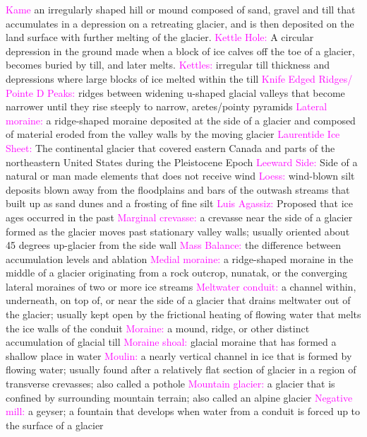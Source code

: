 \documentclass{article}
\newcommand{\pink}[1]{\textcolor{magenta}{#1}}
\newcommand{\vocab}[1]{{\pink{#1}}}
\begin{document}
\begin{multicols*}{4}
		\vocab{Kame} an irregularly shaped hill or mound composed of sand, gravel and till that accumulates in a depression on a retreating glacier, and is then deposited on the land surface with further melting of the glacier.  
		\vocab{Kettle Hole: } A circular depression in the ground made when a block of ice calves off the toe of a glacier, becomes buried by till, and later melts.  
		\vocab{Kettles: } irregular till thickness and depressions where large blocks of ice melted within the till  
		\vocab{Knife Edged Ridges/ Pointe D Peaks: } ridges between widening u-shaped glacial valleys that become narrower until they rise steeply to narrow, aretes/pointy pyramids 
		\vocab{        Lateral moraine: } a ridge-shaped moraine deposited at the side of a glacier and composed of material eroded from the valley walls by the moving glacier 
		\vocab{Laurentide Ice Sheet: }The continental glacier that covered eastern Canada and parts of the northeastern United States during the Pleistocene Epoch  
		\vocab{Leeward Side: }Side of a natural or man made elements that does not receive wind  
		\vocab{Loess: } wind-blown silt deposits blown away from the floodplains and bars of the outwash streams that built up as sand dunes and a frosting of fine silt  
		\vocab{Luis Agassiz: } Proposed that ice ages occurred in the past   
		\vocab{        Marginal crevasse: } a crevasse near the side of a glacier formed as the glacier moves past stationary valley walls; usually oriented about 45 degrees up-glacier from the side wall 
		\vocab{Mass Balance: } the difference between accumulation levels and ablation  
		\vocab{        Medial moraine: } a ridge-shaped moraine in the middle of a glacier originating from a rock outcrop, nunatak, or the converging lateral moraines of two or more ice streams 
		\vocab{        Meltwater conduit: } a channel within, underneath, on top of, or near the side of a glacier that drains meltwater out of the glacier; usually kept open by the frictional heating of flowing water that melts the ice walls of the conduit 
		\vocab{        Moraine: } a mound, ridge, or other distinct accumulation of glacial till 
		\vocab{        Moraine shoal: } glacial moraine that has formed a shallow place in water 
		\vocab{        Moulin: } a nearly vertical channel in ice that is formed by flowing water; usually found after a relatively flat section of glacier in a region of transverse crevasses; also called a pothole 
		\vocab{        Mountain glacier: } a glacier that is confined by surrounding mountain terrain; also called an alpine glacier 
		\vocab{        Negative mill: } a geyser; a fountain that develops when water from a conduit is forced up to the surface of a glacier 

\end{multicols*}
\end{document}
